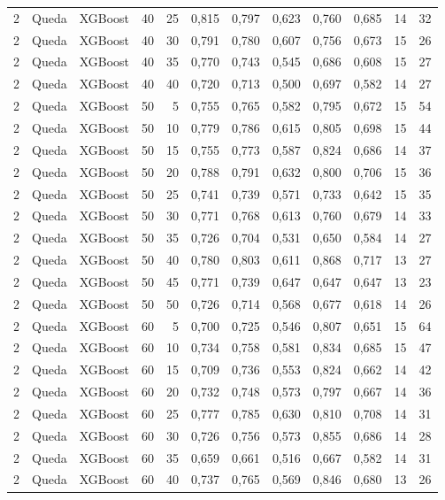 \begin{longtable}{@{}rllrrrrrrrrr@{}}
2 & Queda & XGBoost & 40 & 25 & 0,815 & 0,797 & 0,623 & 0,760 & 0,685 & 14 & 32 \\
2 & Queda & XGBoost & 40 & 30 & 0,791 & 0,780 & 0,607 & 0,756 & 0,673 & 15 & 26 \\
2 & Queda & XGBoost & 40 & 35 & 0,770 & 0,743 & 0,545 & 0,686 & 0,608 & 15 & 27 \\
2 & Queda & XGBoost & 40 & 40 & 0,720 & 0,713 & 0,500 & 0,697 & 0,582 & 14 & 27 \\
2 & Queda & XGBoost & 50 & 5 & 0,755 & 0,765 & 0,582 & 0,795 & 0,672 & 15 & 54 \\
2 & Queda & XGBoost & 50 & 10 & 0,779 & 0,786 & 0,615 & 0,805 & 0,698 & 15 & 44 \\
2 & Queda & XGBoost & 50 & 15 & 0,755 & 0,773 & 0,587 & 0,824 & 0,686 & 14 & 37 \\
2 & Queda & XGBoost & 50 & 20 & 0,788 & 0,791 & 0,632 & 0,800 & 0,706 & 15 & 36 \\
2 & Queda & XGBoost & 50 & 25 & 0,741 & 0,739 & 0,571 & 0,733 & 0,642 & 15 & 35 \\
2 & Queda & XGBoost & 50 & 30 & 0,771 & 0,768 & 0,613 & 0,760 & 0,679 & 14 & 33 \\
2 & Queda & XGBoost & 50 & 35 & 0,726 & 0,704 & 0,531 & 0,650 & 0,584 & 14 & 27 \\
2 & Queda & XGBoost & 50 & 40 & 0,780 & 0,803 & 0,611 & 0,868 & 0,717 & 13 & 27 \\
2 & Queda & XGBoost & 50 & 45 & 0,771 & 0,739 & 0,647 & 0,647 & 0,647 & 13 & 23 \\
2 & Queda & XGBoost & 50 & 50 & 0,726 & 0,714 & 0,568 & 0,677 & 0,618 & 14 & 26 \\
2 & Queda & XGBoost & 60 & 5 & 0,700 & 0,725 & 0,546 & 0,807 & 0,651 & 15 & 64 \\
2 & Queda & XGBoost & 60 & 10 & 0,734 & 0,758 & 0,581 & 0,834 & 0,685 & 15 & 47 \\
2 & Queda & XGBoost & 60 & 15 & 0,709 & 0,736 & 0,553 & 0,824 & 0,662 & 14 & 42 \\
2 & Queda & XGBoost & 60 & 20 & 0,732 & 0,748 & 0,573 & 0,797 & 0,667 & 14 & 36 \\
2 & Queda & XGBoost & 60 & 25 & 0,777 & 0,785 & 0,630 & 0,810 & 0,708 & 14 & 31 \\
2 & Queda & XGBoost & 60 & 30 & 0,726 & 0,756 & 0,573 & 0,855 & 0,686 & 14 & 28 \\
2 & Queda & XGBoost & 60 & 35 & 0,659 & 0,661 & 0,516 & 0,667 & 0,582 & 14 & 31 \\
2 & Queda & XGBoost & 60 & 40 & 0,737 & 0,765 & 0,569 & 0,846 & 0,680 & 13 & 26 \\

\end{longtable}
